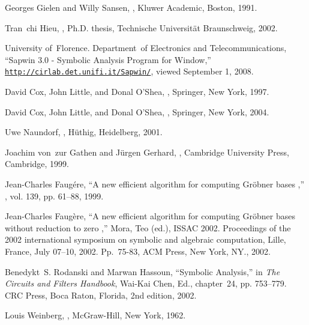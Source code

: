 \documentclass[10pt,twocolumn,pagenumbers]{IEEEtran}
\begin{document}

\begin{thebibliography}{10}

Georges Gielen and Willy Sansen,
,
\newblock Kluwer Academic, Boston, 1991.

Tran~chi Hieu,
,
\newblock Ph.D. thesis, Technische Universit\"at Braunschweig, 2002.

University of~Florence. Department~of Electronics and Telecommunications,
\newblock ``Sapwin 3.0 - {S}ymbolic {A}nalysis {P}rogram for {W}indow,''
  \href{http://cirlab.det.unifi.it/Sapwin/}{\tt http://cirlab.det.unifi.it/Sapwin/},
\newblock viewed September 1, 2008.

David Cox, John Little, and Donal O'Shea,
,
\newblock Springer, New York, 1997.

David Cox, John Little, and Donal O'Shea,
,
\newblock Springer, New York, 2004.

Uwe Naundorf,
,
\newblock H\"uthig, Heidelberg, 2001.

Joachim von~zur {\uppercase{G}at}hen and J\"urgen Gerhard,
,
\newblock Cambridge University Press, Cambridge, 1999.

Jean-Charles Faug\'ere,
\newblock ``A new efficient algorithm for computing {G}r\"obner bases
  ,''
, vol. 139, pp. 61--88, 1999.

Jean-Charles Faug\`ere,
\newblock ``A new efficient algorithm for computing {G}r\"obner bases without
  reduction to zero ,'' {Mora, Teo (ed.), ISSAC 2002. Proceedings of
  the 2002 international symposium on symbolic and algebraic computation,
  Lille, France, July 07--10, 2002. Pp.\ 75-83, ACM Press, New York, NY.},
  2002.

Benedykt~S. Rodanski and Marwan Hassoun,
\newblock ``Symbolic {A}nalysis,''
\newblock in {\em The Circuits and Filters Handbook}, Wai-Kai Chen, Ed.,
  chapter~24, pp. 753--779. CRC Press, Boca Raton, Florida, 2nd edition, 2002.

Louis Weinberg,
,
\newblock McGraw-Hill, New York, 1962.


\end{thebibliography}
\end{document}
